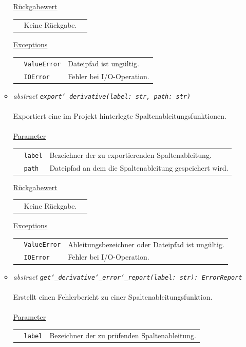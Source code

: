 \documentclass{article}
\begin{document}
\begin{itemize}
\begin{itemize}
\underline{Rückgabewert}\\
\begin{tabular}{lll}
 & Keine Rückgabe.\\
\end{tabular}

\underline{Exceptions}\\
\begin{tabular}{lll}
 & \texttt{ValueError} & Dateipfad ist ungültig.\\
 & \texttt{IOError} & Fehler bei I/O-Operation.\\
\end{tabular}


\item \textit{\flqq{}abstract\frqq} \texttt{\textit{export\char`_derivative(label: str, path: str)}}\\\\
Exportiert eine im Projekt hinterlegte Spaltenableitungsfunktionen.
\\\\
\underline{Parameter}\\
\begin{tabular}{lll}
 & \texttt{label} & Bezeichner der zu exportierenden Spaltenableitung.\\
 & \texttt{path} & Dateipfad an dem die Spaltenableitung gespeichert wird.\\
\end{tabular}

\underline{Rückgabewert}\\
\begin{tabular}{lll}
 & Keine Rückgabe.\\
\end{tabular}

\underline{Exceptions}\\
\begin{tabular}{lll}
 & \texttt{ValueError} & Ableitungsbezeichner oder Dateipfad ist ungültig.\\
 & \texttt{IOError} & Fehler bei I/O-Operation.\\
\end{tabular}


\item \textit{\flqq{}abstract\frqq} \texttt{\textit{get\char`_derivative\char`_error\char`_report(label: str): ErrorReport}}\\\\
Erstellt einen Fehlerbericht zu einer Spaltenableitungsfunktion.
\\\\
\underline{Parameter}\\
\begin{tabular}{lll}
 & \texttt{label} & Bezeichner der zu prüfenden Spaltenableitung.\\
\end{tabular}


\end{itemize}
\end{itemize}
\end{document}
